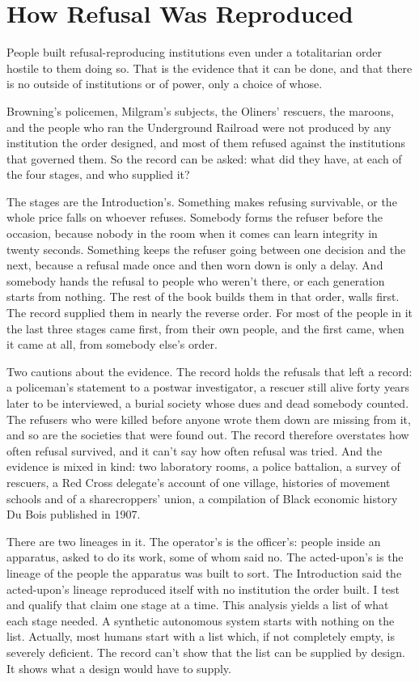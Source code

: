 \chapter{How Refusal Was Reproduced}
\label{ch:reproduced}
People built refusal-reproducing institutions even under a totalitarian order hostile to them doing so. That is the evidence that it can be done, and that there is no outside of institutions or of power, only a choice of whose.

Browning's policemen, Milgram's subjects, the Oliners' rescuers, the maroons, and the people who ran the Underground Railroad were not produced by any institution the order designed, and most of them refused against the institutions that governed them. So the record can be asked: what did they have, at each of the four stages, and who supplied it?

The stages are the Introduction's. Something makes refusing survivable, or the whole price falls on whoever refuses. Somebody forms the refuser before the occasion, because nobody in the room when it comes can learn integrity in twenty seconds. Something keeps the refuser going between one decision and the next, because a refusal made once and then worn down is only a delay. And somebody hands the refusal to people who weren't there, or each generation starts from nothing. The rest of the book builds them in that order, walls first. The record supplied them in nearly the reverse order. For most of the people in it the last three stages came first, from their own people, and the first came, when it came at all, from somebody else's order.

Two cautions about the evidence. The record holds the refusals that left a record: a policeman's statement to a postwar investigator, a rescuer still alive forty years later to be interviewed, a burial society whose dues and dead somebody counted. The refusers who were killed before anyone wrote them down are missing from it, and so are the societies that were found out. The record therefore overstates how often refusal survived, and it can't say how often refusal was tried. And the evidence is mixed in kind: two laboratory rooms, a police battalion, a survey of rescuers, a Red Cross delegate's account of one village, histories of movement schools and of a sharecroppers' union, a compilation of Black economic history Du Bois published in 1907.

There are two lineages in it. The operator's is the officer's: people inside an apparatus, asked to do its work, some of whom said no. The acted-upon's is the lineage of the people the apparatus was built to sort. The Introduction said the acted-upon's lineage reproduced itself with no institution the order built. I test and qualify that claim one stage at a time. This analysis yields a list of what each stage needed. A synthetic autonomous system starts with nothing on the list. Actually, most humans start with a list which, if not completely empty, is severely deficient. The record can't show that the list can be supplied by design. It shows what a design would have to supply.
